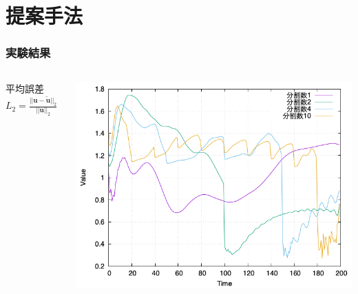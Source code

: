 \documentclass[aspectratio=169,dvipdfmx,hyperref={bookmarks=true}]{beamer}
\begin{document}
\section{提案手法}
\begin{frame}
\frametitle{実験結果}
\vspace{-10pt}
\begin{columns}[T]
	\begin{column}{0.15\linewidth}
	\begin{block}{}
	平均誤差$L_2 = \frac{|| \bm{u} - \bm{\widetilde{u}} ||_2}{||  \bm{u} ||_2}$
	\end{block}
    	\end{column}
	\begin{column}{0.85\linewidth}
	\vspace{-20pt}
		\includegraphics[width=0.9\linewidth]{images/128error.png}
	   \end{column}
    \end{columns}
 \end{frame}
  
\end{document}
